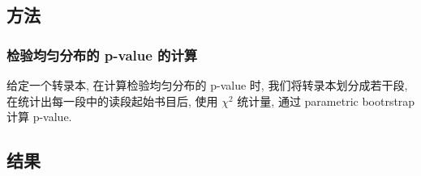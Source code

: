 \subsection{方法}
\subsubsection{检验均匀分布的 p-value 的计算}
给定一个转录本, 在计算检验均匀分布的 p-value 时, 
我们将转录本划分成若干段, 在统计出每一段中的读段起始书目后, 使用 $\chi^2$ 统计量, 
通过 parametric bootrstrap \cite{efron1993introduction} 计算 p-value. 

\subsection{结果}


